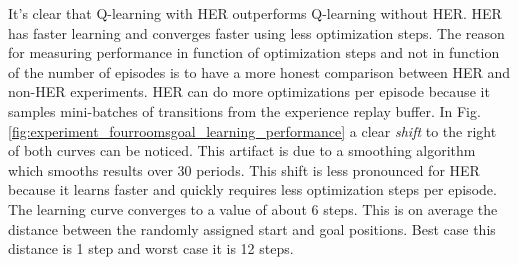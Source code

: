\documentclass[conference]{IEEEtran}
\begin{document}
It's clear that Q-learning with HER outperforms Q-learning without HER. HER has faster learning and converges faster using less optimization steps. The reason for measuring performance in function of optimization steps and not in function of the number of episodes is to have a more honest comparison between HER and non-HER experiments. HER can do more optimizations per episode because it samples mini-batches of transitions from the experience replay buffer. In Fig. \ref{fig:experiment_fourroomsgoal_learning_performance} a clear \textit{shift} to the right of both curves can be noticed. This artifact is due to a smoothing algorithm which smooths results over 30 periods. This shift is less pronounced for HER because it learns faster and quickly requires less optimization steps per episode. The learning curve converges to a value of about 6 steps. This is on average the distance between the randomly assigned start and goal positions. Best case this distance is 1 step and worst case it is 12 steps.
\end{document}
